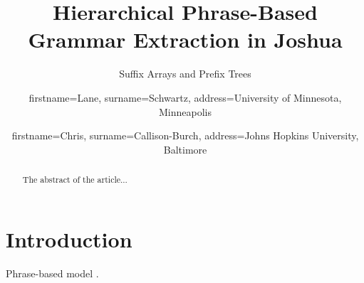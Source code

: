 \documentclass{pbml}
\begin{document}
% 

\title{Hierarchical Phrase-Based Grammar Extraction in Joshua}


\subtitle{Suffix Arrays and Prefix Trees}


\author{firstname=Lane, surname=Schwartz,
       address={University of Minnesota, Minneapolis}}

\author{firstname=Chris, surname=Callison-Burch,
       address={Johns Hopkins University, Baltimore}}

% 



\maketitle


% 

\begin{abstract}
The abstract of the article...
\end{abstract}



\section{Introduction}

Phrase-based model \cite{Koehn2003,Marcu2002,Och2004,Och1999}.
\end{document}
